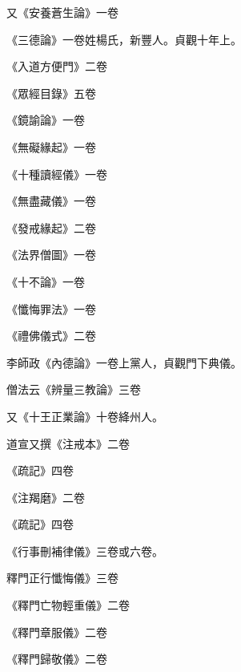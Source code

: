\begin{pinyinscope}
 又《安養蒼生論》一卷



 《三德論》一卷姓楊氏，新豐人。貞觀十年上。



 《入道方便門》二卷



 《眾經目錄》五卷



 《鏡諭論》一卷



 《無礙緣起》一卷



 《十種讀經儀》一卷



 《無盡藏儀》一卷



 《發戒緣起》二卷



 《法界僧圖》一卷



 《十不論》一卷



 《懺悔罪法》一卷



 《禮佛儀式》二卷



 李師政《內德論》一卷上黨人，貞觀門下典儀。



 僧法云《辨量三教論》三卷



 又《十王正業論》十卷絳州人。



 道宣又撰《注戒本》二卷



 《疏記》四卷



 《注羯磨》二卷



 《疏記》四卷



 《行事刪補律儀》三卷或六卷。



 釋門正行懺悔儀》三卷



 《釋門亡物輕重儀》二卷



 《釋門章服儀》二卷



 《釋門歸敬儀》二卷




\end{pinyinscope}
